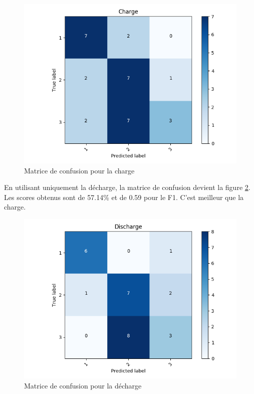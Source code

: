 \begin{figure}[H]
    \centering
    \includegraphics[scale=0.5]{images/Confcha.png}
    \caption{Matrice de confusion pour la charge}
    \label{fig:HMMconfCha}
\end{figure}

En utilisant uniquement la décharge, la matrice de confusion devient la figure \ref{fig:HMMconfDecha}. Les scores obtenus sont de 57.14\% et de 0.59 pour le F1. C'est meilleur que la charge. 

\begin{figure}[H]
    \centering
    \includegraphics[scale=0.5]{images/Confdech.png}
    \caption{Matrice de confusion pour la décharge}
    \label{fig:HMMconfDecha}
\end{figure}

